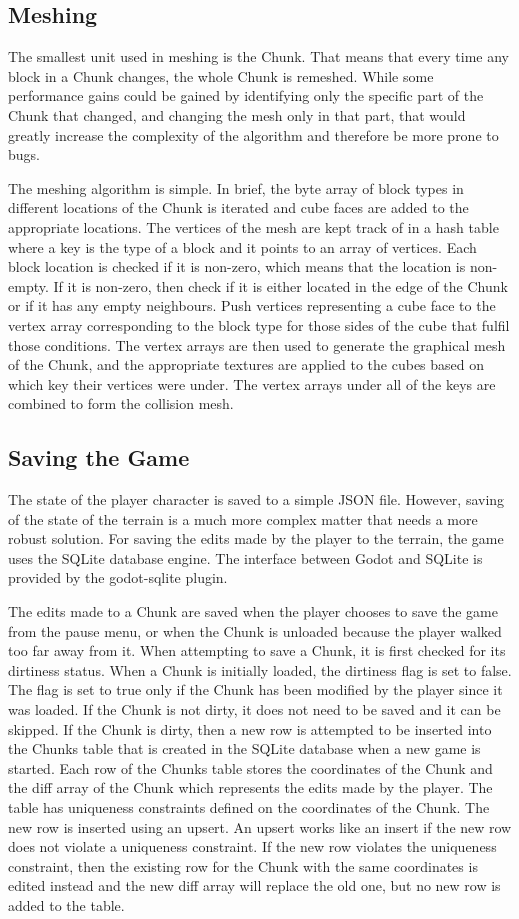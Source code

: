 \documentclass{report}
\begin{document}
\subsection{Meshing}
The smallest unit used in meshing is the Chunk. That means that every time any block in a Chunk changes, the whole Chunk is remeshed. While some performance gains could be gained by identifying only the specific part of the Chunk that changed, and changing the mesh only in that part, that would greatly increase the complexity of the algorithm and therefore be more prone to bugs.\par
The meshing algorithm is simple. In brief, the byte array of block types in different locations of the Chunk is iterated and cube faces are added to the appropriate locations. The vertices of the mesh are kept track of in a hash table where a key is the type of a block and it points to an array of vertices. Each block location is checked if it is non-zero, which means that the location is non-empty. If it is non-zero, then check if it is either located in the edge of the Chunk or if it has any empty neighbours. Push vertices representing a cube face to the vertex array corresponding to the block type for those sides of the cube that fulfil those conditions. The vertex arrays are then used to generate the graphical mesh of the Chunk, and the appropriate textures are applied to the cubes based on which key their vertices were under. The vertex arrays under all of the keys are combined to form the collision mesh.
\subsection{Saving the Game}
The state of the player character is saved to a simple JSON file. However, saving of the state of the terrain is a much more complex matter that needs a more robust solution. For saving the edits made by the player to the terrain, the game uses the SQLite\cite{sqlite} database engine. The interface between Godot and SQLite is provided by the godot-sqlite\cite{godotsqlite} plugin.\par
The edits made to a Chunk are saved when the player chooses to save the game from the pause menu, or when the Chunk is unloaded because the player walked too far away from it. When attempting to save a Chunk, it is first checked for its dirtiness status. When a Chunk is initially loaded, the dirtiness flag is set to false. The flag is set to true only if the Chunk has been modified by the player since it was loaded. If the Chunk is not dirty, it does not need to be saved and it can be skipped. If the Chunk is dirty, then a new row is attempted to be inserted into the Chunks table that is created in the SQLite database when a new game is started. Each row of the Chunks table stores the coordinates of the Chunk and the diff array of the Chunk which represents the edits made by the player. The table has uniqueness constraints defined on the coordinates of the Chunk. The new row is inserted using an upsert\cite{upsert}. An upsert works like an insert if the new row does not violate a uniqueness constraint. If the new row violates the uniqueness constraint, then the existing row for the Chunk with the same coordinates is edited instead and the new diff array will replace the old one, but no new row is added to the table.
\end{document}
